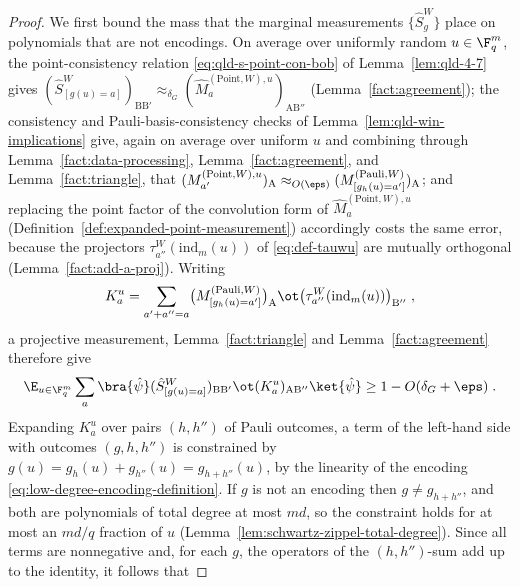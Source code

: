 \begin{proof}
	\leanok
	We first bound the mass that the marginal measurements $\{\hat{S}^W_g\}$ place on polynomials that are not encodings. On average over uniformly random $u \in \F_q^m$, the point-consistency relation \eqref{eq:qld-s-point-con-bob} of Lemma~\ref{lem:qld-4-7} gives $(\hat{S}^W_{[g(u)=a]})_{\mathrm{B}\mathrm{B}'} \approx_{\delta_G} (\hat{M}^{(\mathrm{Point},W),u}_a)_{\mathrm{A}\mathrm{B}''}$ (Lemma~\ref{fact:agreement}); the consistency and Pauli-basis-consistency checks of Lemma~\ref{lem:qld-win-implications} give, again on average over uniform $u$ and combining through Lemma~\ref{fact:data-processing}, Lemma~\ref{fact:agreement}, and Lemma~\ref{fact:triangle}, that $(M^{(\mathrm{Point},W),u}_{a'})_{\mathrm{A}} \approx_{O(\eps)} (M^{(\mathrm{Pauli},W)}_{[g_h(u)=a']})_{\mathrm{A}}$; and replacing the point factor of the convolution form of $\hat{M}^{(\mathrm{Point},W),u}_a$ (Definition~\ref{def:expanded-point-measurement}) accordingly costs the same error, because the projectors $\tau^W_{a''}(\mathrm{ind}_m(u))$ of \eqref{eq:def-tauwu} are mutually orthogonal (Lemma~\ref{fact:add-a-proj}). Writing
	\[
		K^u_a = \sum_{a' + a'' = a} \bigl(M^{(\mathrm{Pauli},W)}_{[g_h(u)=a']}\bigr)_{\mathrm{A}} \ot \bigl(\tau^W_{a''}(\mathrm{ind}_m(u))\bigr)_{\mathrm{B}''}\;,
	\]
	a projective measurement, Lemma~\ref{fact:triangle} and Lemma~\ref{fact:agreement} therefore give
	\[
		\E_{u \in \F_q^m} \sum_a \bra{\hat\psi} (\hat{S}^W_{[g(u)=a]})_{\mathrm{B}\mathrm{B}'} \ot (K^u_a)_{\mathrm{A}\mathrm{B}''} \ket{\hat\psi} \geq 1 - O(\delta_G + \eps)\;.
	\]
	Expanding $K^u_a$ over pairs $(h, h'')$ of Pauli outcomes, a term of the left-hand side with outcomes $(g, h, h'')$ is constrained by $g(u) = g_h(u) + g_{h''}(u) = g_{h + h''}(u)$, by the linearity of the encoding \eqref{eq:low-degree-encoding-definition}. If $g$ is not an encoding then $g \neq g_{h+h''}$, and both are polynomials of total degree at most $md$, so the constraint holds for at most an $md/q$ fraction of $u$ (Lemma~\ref{lem:schwartz-zippel-total-degree}). Since all terms are nonnegative and, for each $g$, the operators of the $(h,h'')$-sum add up to the identity, it follows that

\end{proof}
